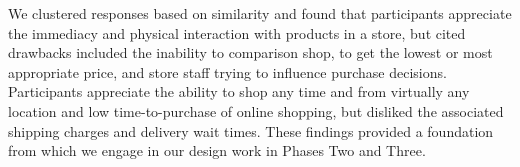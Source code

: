 We clustered responses based on similarity and found that
participants appreciate the immediacy and physical interaction with products in a store, but cited drawbacks included the inability to comparison shop, to get the lowest or most appropriate price,
and store staff trying to influence purchase decisions.  Participants appreciate the ability to shop any time and from virtually any location
   and low time-to-purchase of online shopping,  but disliked the associated shipping charges and delivery wait times. 
These findings provided a foundation from which we engage in our design work in Phases Two and Three. 
